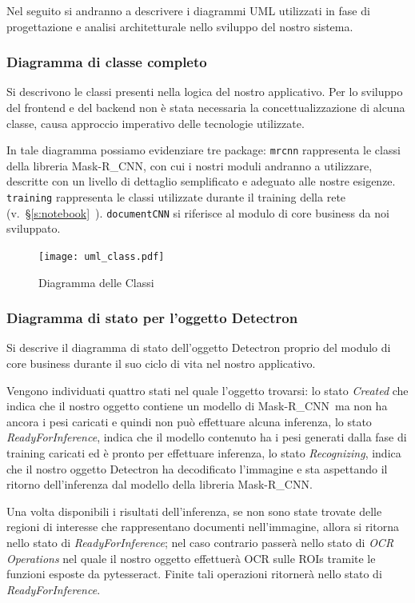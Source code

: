 \documentclass[12pt,a4paper]{article}
\newcommand{\mrcnn}{Mask-R\_CNN}
\begin{document}
Nel seguito si andranno a descrivere i diagrammi UML utilizzati in fase
di progettazione e analisi architetturale nello sviluppo del nostro
sistema.

\subsubsection{Diagramma di classe completo}

Si descrivono le classi presenti nella logica del nostro applicativo.
Per lo sviluppo del frontend e del backend non è stata necessaria la
concettualizzazione di alcuna classe, causa approccio imperativo delle
tecnologie utilizzate.

In tale diagramma possiamo evidenziare tre package: \texttt{mrcnn}
rappresenta le classi della libreria \mrcnn, con cui i nostri moduli
andranno a utilizzare, descritte con un livello di dettaglio
semplificato e adeguato alle nostre esigenze. \texttt{training}
rappresenta le classi utilizzate durante il training della rete
(v.~§\ref{s:notebook}~). \texttt{documentCNN} si
riferisce al modulo di core business da noi sviluppato.

\begin{figure}[H]
    \caption{Diagramma delle Classi}
    \centering
    \texttt{[image: uml\_class.pdf]}
\end{figure}

\subsubsection{Diagramma di stato per l'oggetto Detectron}

Si descrive il diagramma di stato dell'oggetto Detectron proprio del
modulo di core business durante il suo ciclo di vita  nel nostro
applicativo.

Vengono individuati quattro stati nel quale l'oggetto trovarsi: lo stato
\textit{Created} che indica che il nostro oggetto contiene un modello di
\mrcnn\ ma non ha ancora i pesi caricati e quindi non può effettuare
alcuna inferenza, lo stato \textit{ReadyForInference}, indica che il
modello contenuto ha i pesi generati dalla fase di training caricati ed
è pronto per effettuare inferenza, lo stato \textit{Recognizing}, indica
che il nostro oggetto Detectron ha decodificato l'immagine e sta
aspettando il ritorno dell'inferenza dal modello della libreria \mrcnn.

Una volta disponibili i risultati dell'inferenza, se non sono state
trovate delle regioni di interesse che rappresentano documenti
nell'immagine, allora si ritorna nello stato di
\textit{ReadyForInference}; nel caso contrario passerà nello stato di
\textit{OCR Operations} nel quale il nostro oggetto effettuerà OCR sulle
ROIs tramite le funzioni esposte da pytesseract. Finite tali operazioni
ritornerà nello stato di \textit{ReadyForInference}.
\end{document}
